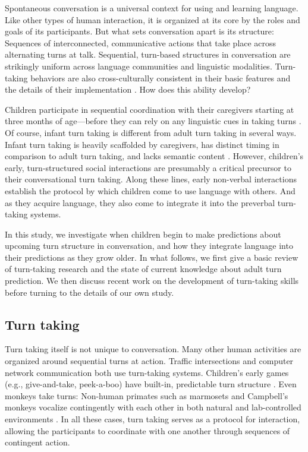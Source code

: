 \documentclass[authoryear, 12pt]{elsarticle}
\begin{document}
Spontaneous conversation is a universal context for using and learning language. Like other types of human interaction, it is organized at its core by the roles and goals of its participants. But what sets conversation apart is its structure: Sequences of interconnected, communicative actions that take place across alternating turns at talk. Sequential, turn-based structures in conversation are strikingly uniform across language communities and linguistic modalities. Turn-taking behaviors are also cross-culturally consistent in their basic features and the details of their implementation \citep{de-vos2015, dingemanse2013, stivers2009}. How does this ability develop? 

Children participate in sequential coordination with their caregivers starting at three months of age---before they can rely on any linguistic cues in taking turns \citep[see, among others, ][]{bateson1975, hilbrink2015, jaffe2001, snow1977}. Of course, infant turn taking is different from adult turn taking in several ways. Infant turn taking is heavily scaffolded by caregivers, has distinct timing in comparison to adult turn taking, and lacks semantic content \citep{hilbrink2015, jaffe2001}. However, children's early, turn-structured social interactions are presumably a critical precursor to their conversational turn taking. Along these lines, early non-verbal interactions establish the protocol by which children come to use language with others. And as they acquire language, they also come to integrate it into the preverbal turn-taking systems.

In this study, we investigate when children begin to make predictions about upcoming turn structure in conversation, and how they integrate language into their predictions as they grow older. In what follows, we first give a basic review of turn-taking research and the state of current knowledge about adult turn prediction. We then discuss recent work on the development of turn-taking skills before turning to the details of our own study.

\subsection{Turn taking}

Turn taking itself is not unique to conversation. Many other human activities are organized around sequential turns at action. Traffic intersections and computer network communication both use turn-taking systems. Children's early games (e.g., give-and-take, peek-a-boo) have built-in, predictable turn structure \citep{ratner1978, ross1987}. Even monkeys take turns: Non-human primates such as marmosets and Campbell's monkeys vocalize contingently with each other in both natural and lab-controlled environments \citep{lemasson2011, takahashi2013}. In all these cases, turn taking serves as a protocol for interaction, allowing the participants to coordinate with one another through sequences of contingent action. 
\end{document}
